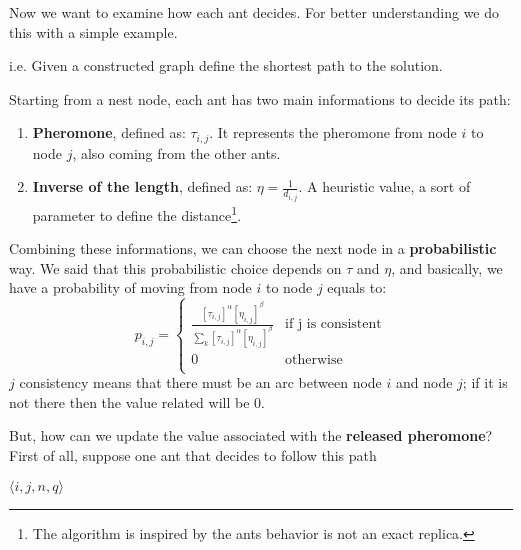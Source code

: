 Now we want to examine how each ant decides. For better understanding we do this with a simple example.
\begin{example}
    i.e. Given a constructed graph define the shortest path to the solution. \vspace{3.5pt}
    \begin{center}
    \end{center} \vspace{3.5pt}

    Starting from a nest node, each ant has two main informations to decide its path:
    \begin{enumerate}[nosep]
        \item \textbf{Pheromone}, defined as: $\tau_{i,j}$. It represents the pheromone from node $i$ to node $j$, also coming from the other ants.
        \item  \textbf{Inverse of the length}, defined as: $\eta = \frac{1}{d_{i, j}}$. A heuristic value, a sort of parameter to define the distance\footnote{The algorithm is inspired by the ants behavior is not an exact replica.}.
    \end{enumerate} \vspace{3.5pt}

    Combining these informations, we can choose the next node in a \textbf{probabilistic} way. We said that this probabilistic choice depends on $\tau$ and $\eta$, and basically,
    we have a probability of moving from node $i$ to node $j$ equals to: 
    \begin{equation}
        p_{i, j} = 
        \begin{cases}
            \frac{[\tau_{i,j}]^\alpha [\eta_{i,j}]^\beta}{\sum_{k} [\tau_{i,j}]^\alpha [\eta_{i,j}]^\beta} & \text{if j is consistent} \\
            0 & \text{otherwise} \\
        \end{cases}
    \end{equation}
    $j$ consistency means that there must be an arc between node $i$ and node $j$; if it is not there then the value related will be $0$. \vspace{3.5pt}

    But, how can we update the value associated with the \textbf{released pheromone}? First of all, suppose one ant that decides to follow this path \vspace{3.5pt}
    \begin{center}
        $\langle i, j, n, q\rangle$
    \end{center} \vspace{3.5pt}


\end{example}
